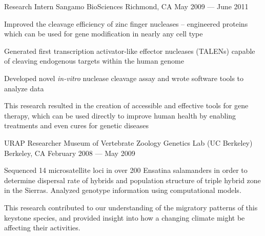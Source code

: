 

\begin{cventries}

  \cventry
  {Research Intern} %
  {Sangamo BioSciences} %
  {Richmond, CA} %
  {May 2009 --- June 2011} %
  {
    \begin{cvitems} %
    \item {Improved the cleavage efficiency of zinc finger nucleases – engineered proteins which can be used for gene modification in nearly any cell type}
    \item {Generated first transcription activator-like effector nucleases (TALENs) capable of cleaving endogenous targets within the human genome}
    \item {Developed novel {\em in-vitro} nuclease cleavage assay and wrote software tools to analyze data}
    \item This research resulted in the creation of accessible and effective tools for gene therapy, which can be used directly to improve human health by enabling treatments and even cures for genetic diseases
    \end{cvitems}
  }

  \cventry
  {URAP Researcher} %
  {Museum of Vertebrate Zoology Genetics Lab (UC Berkeley)} %
  {Berkeley, CA} %
  {February 2008 --- May 2009} %
  {
    \begin{cvitems} %
    \item {Sequenced 14 microsatellite loci in over 200 Ensatina salamanders in order to determine dispersal rate of hybrids and population structure of triple hybrid zone in the Sierras. Analyzed genotype information using computational models.}
    \item {This research contributed to our understanding of the migratory patterns of this keystone species, and provided insight into how a changing climate might be affecting their activities.}
    \end{cvitems}
  }

\end{cventries}
